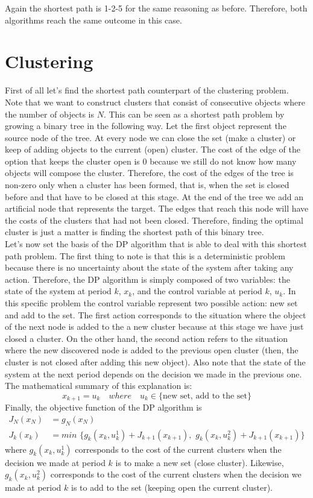 \documentclass[11pt, oneside]{article}   	%
\begin{document}
Again the shortest path is 1-2-5 for the same reasoning as before. Therefore, both algorithms reach the same outcome in this case.


\section{Clustering}
First of all let's find the shortest path counterpart of the clustering problem. Note that we want to construct clusters that consist of consecutive objects where the number of objects is $N$. This can be seen as a shortest path problem by growing a binary tree in the following way. Let the first object represent the source node of the tree. At every node we can close the set (make a cluster) or keep of adding objects to the current (open) cluster. The cost of the edge of the option that keeps the cluster open is 0 because we still do not know how many objects will compose the cluster. Therefore, the cost of the edges of the tree is non-zero only when a cluster has been formed, that is, when the set is closed before and that have to be closed at this stage. At the end of the tree we add an artificial node that represents the target. The edges that reach this node will have the costs of the clusters that had not been closed. Therefore, finding the optimal cluster is just a matter is finding the shortest path of this binary tree.\\

Let's now set the basis of the DP algorithm that is able to deal with this shortest path problem. The first thing to note is that this is a deterministic problem because there is no uncertainty about the state of the system after taking any action. Therefore, the DP algorithm is simply composed of two variables: the state of the system at period $k$, $x_{k}$, and the control variable at period $k$, $u_{k}$. In this specific problem the control variable represent two possible action: new set and add to the set. The first action corresponds to the situation where the object of the next node is added to the a new cluster because at this stage we have just closed a cluster. On the other hand, the second action refers to the situation where the new discovered node is added to the previous open cluster (then, the cluster is not closed after adding this new object). Also note that the state of the system at the next period depends on the decision we made in the previous one. The mathematical summary of this explanation is:
$$x_{k+1} = u_{k} \quad where \quad u_{k} \in \{\text{new set, add to the set}\}$$
Finally, the objective function of the DP algorithm is
\begin{align*}
J_{N}(x_{N}) &= g_{N}(x_{N})\\
J_{k}(x_{k}) &= min \, \, \big\{g_{k}(x_{k},u_{k}^{1}) + J_{k+1}(x_{k+1}),\, \, g_{k}(x_{k},u_{k}^{2}) + J_{k+1}(x_{k+1})\big\}
\end{align*} 
where $g_{k}(x_{k},u_{k}^{1})$ corresponds to the cost of the current clusters when the decision we made at period $k$ is to make a new set (close cluster). Likewise, $g_{k}(x_{k},u_{k}^{2})$ corresponds to the cost of the current clusters when the decision we made at period $k$ is to add to the set (keeping open the current cluster).
\end{document}
